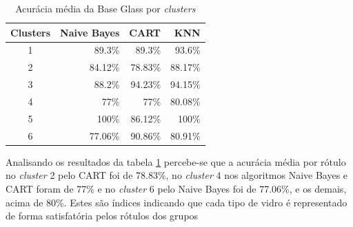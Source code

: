 \begin{table}[!h]
\centering
\caption{Acurácia média da Base Glass por \textit{clusters}}
\label{tab:acuracia:glass}
\begin{tabular}{c|r|r|r}
\hline
\textbf{Clusters} & \textbf{Naive Bayes} & \textbf{CART} & \textbf{KNN} \\ \hline
    1            & 89.3\%    &  89.3\% &    93.6\%     \\
    2            & 84.12\%  & 78.83\% &  88.17\%     \\
    3            & 88.2\%   & 94.23\% & 94.15\%   \\
    4            & 77\%     &  77\%     & 80.08\%   \\
    5            & 100\%    & 86.12\% &   100\% \\
    6            &  77.06\% & 90.86\%   &  80.91\%  \\
    
\end{tabular}
\end{table}



Analisando os resultados da tabela \ref{tab:acuracia:glass} percebe-se que a acurácia média por rótulo no \textit{cluster} 2 pelo CART foi de 78.83\%, no \textit{cluster} 4 nos algoritmos Naive Bayes e CART foram de 77\% e no \textit{cluster} 6 pelo Naive Bayes foi de 77.06\%, e os demais, acima de 80\%. Estes são índices indicando que cada tipo de vidro  é representado de forma satisfatória pelos rótulos dos grupos



% 
% 

